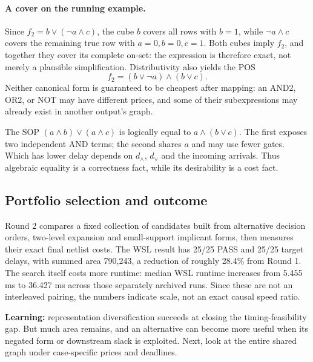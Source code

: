 \paragraph{A cover on the running example.} Since $f_2=b\lor(\neg a\land c)$, the cube $b$ covers all rows with $b=1$, while $\neg a\land c$ covers the remaining true row with $a=0,b=0,c=1$. Both cubes imply $f_2$, and together they cover its complete on-set: the expression is therefore exact, not merely a plausible simplification. Distributivity also yields the POS
\[
 f_2=(b\lor\neg a)\land(b\lor c).
\]
Neither canonical form is guaranteed to be cheapest after mapping: an AND2, OR2, or NOT may have different prices, and some of their subexpressions may already exist in another output's graph.

\begin{example}
The SOP $(a\land b)\lor(a\land c)$ is logically equal to $a\land(b\lor c)$. The first exposes two independent AND terms; the second shares $a$ and may use fewer gates. Which has lower delay depends on $d_{\land}$, $d_{\lor}$ and the incoming arrivals. Thus algebraic equality is a correctness fact, while its desirability is a cost fact.
\end{example}

\subsection{Portfolio selection and outcome}
Round 2 compares a fixed collection of candidates built from alternative decision orders, two-level expansion and small-support implicant forms, then measures their exact final netlist costs. The WSL result has 25/25 PASS and 25/25 target delays, with summed area 790,243, a reduction of roughly 28.4\% from Round 1. The search itself costs more runtime: median WSL runtime increases from 5.455 ms to 36.427 ms across those separately archived runs. Since these are not an interleaved pairing, the numbers indicate scale, not an exact causal speed ratio.

\begin{tcolorbox}[colback=ResearchSage!25,colframe=ResearchSage,title=Decision after Round 2]
\textbf{Learning:} representation diversification succeeds at closing the timing-feasibility gap. But much area remains, and an alternative can become more useful when its negated form or downstream slack is exploited. Next, look at the entire shared graph under case-specific prices and deadlines.
\end{tcolorbox}

